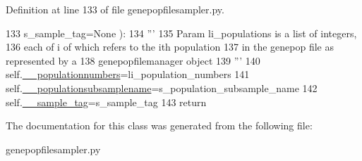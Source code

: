 Definition at line 133 of file genepopfilesampler.\+py.


\begin{DoxyCode}
133                 s\_sample\_tag=\textcolor{keywordtype}{None} ):
134         \textcolor{stringliteral}{'''}
135 \textcolor{stringliteral}{        Param li\_populations is a list of integers,}
136 \textcolor{stringliteral}{        each of i of which refers to the ith population}
137 \textcolor{stringliteral}{        in the genepop file as represented by a }
138 \textcolor{stringliteral}{        genepopfilemanager object}
139 \textcolor{stringliteral}{        '''}
140         self.\hyperlink{classnegui_1_1genepopfilesampler_1_1GenepopFileSampleParams_a48dfd2df4eb75dbacdc8a274cd3323ad}{\_\_populationnumbers}=li\_population\_numbers
141         self.\hyperlink{classnegui_1_1genepopfilesampler_1_1GenepopFileSampleParams_ae03531d2c9d450d7f717816a06f3a08a}{\_\_populationsubsamplename}=s\_population\_subsample\_name
142         self.\hyperlink{classnegui_1_1genepopfilesampler_1_1GenepopFileSampleParams_a8241527923481f69d4e6c4f17de30262}{\_\_sample\_tag}=s\_sample\_tag
143         \textcolor{keywordflow}{return}
\end{DoxyCode}


The documentation for this class was generated from the following file\+:\begin{DoxyCompactItemize}
\item 
genepopfilesampler.\+py\end{DoxyCompactItemize}
